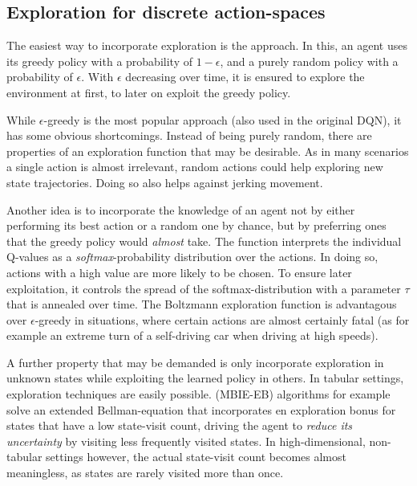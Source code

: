 \subsection{Exploration for discrete action-spaces}

The easiest way to incorporate exploration is the  approach. In this, an agent uses its greedy policy with a probability of $1-\epsilon$, and a purely random policy with a probability of $\epsilon$. With $\epsilon$ decreasing over time, it is ensured to explore the environment at first, to later on exploit the greedy policy. 

While $\epsilon$-greedy is the most popular approach (also used in the original DQN), it has some obvious shortcomings. Instead of being purely random, there are properties of an exploration function that may be desirable. As in many scenarios a single action is almost irrelevant,  random actions could help exploring new state trajectories. Doing so also helps against jerking movement. 

Another idea is to incorporate the knowledge of an agent not by either performing its best action or a random one by chance, but by preferring ones that the greedy policy would \textit{almost} take. The  function interprets the individual Q-values as a \textit{softmax}-probability distribution over the actions. In doing so, actions with a high value are more likely to be chosen. To ensure later exploitation, it controls the spread of the softmax-distribution with a parameter $\tau$ that is annealed over time. The Boltzmann exploration function is advantagous over $\epsilon$-greedy in situations, where certain actions are almost certainly fatal (as for example an extreme turn of a self-driving car when driving at high speeds).

A further property that may be demanded is only incorporate exploration in unknown states while exploiting the learned policy in others. In tabular settings,  exploration techniques are easily possible.  (MBIE-EB) algorithms for example solve an extended Bellman-equation that incorporates en exploration bonus for states that have a low state-visit count, driving the agent to \textit{reduce its uncertainty} by visiting less frequently visited states. In high-dimensional, non-tabular settings however, the actual state-visit count becomes almost meaningless, as states are rarely visited more than once.

